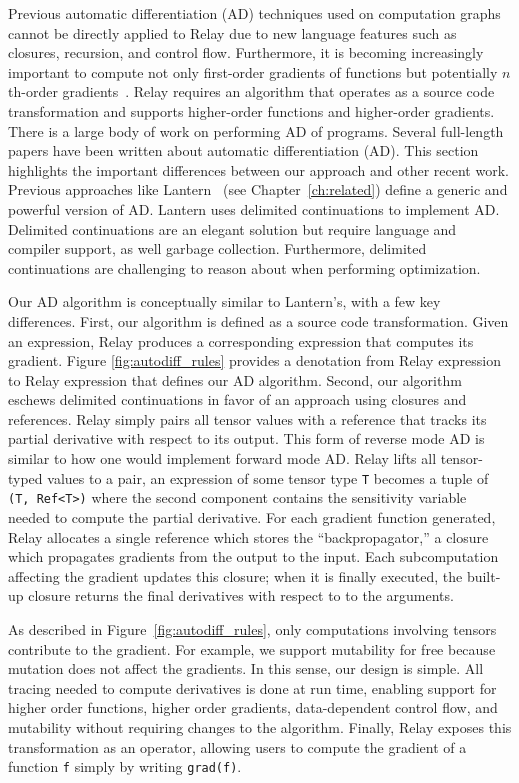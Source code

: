 Previous automatic differentiation (AD) techniques used on
  computation graphs cannot be directly applied to Relay due to new
  language features such as closures, recursion, and control flow.
Furthermore, it is becoming increasingly important to compute not
  only first-order gradients of functions
  but potentially $n$th-order gradients~\citep{neural_ode, darts}.
Relay requires an algorithm that operates as a source code transformation
  and supports higher-order functions and higher-order gradients.
There is a large body of work on performing AD
  of programs.
Several full-length papers have been written about automatic
  differentiation (AD).
This section highlights the important differences
  between our approach and other recent work.
Previous approaches like Lantern~\citep{lantern} (see Chapter~\ref{ch:related})
  define a generic and powerful version of AD.
Lantern uses delimited continuations to implement AD.
Delimited continuations are an elegant solution
  but require language and compiler support,
  as well garbage collection.
Furthermore, delimited continuations are challenging
  to reason about when performing optimization.

Our AD algorithm is conceptually similar to Lantern's,
  with a few key differences.
First, our algorithm is defined as a source code
  transformation.
Given an expression, Relay produces a corresponding
  expression that computes its gradient.
Figure \ref{fig:autodiff_rules} provides a denotation from
  Relay expression to Relay expression that defines our
  AD algorithm.
Second, our algorithm eschews delimited continuations in favor of
  an approach using closures and references.
Relay simply pairs all tensor values with a reference
  that tracks its partial derivative with respect to its
  output.
This form of reverse mode AD is similar to how one
  would implement forward mode AD.
Relay lifts all tensor-typed values to a pair,
  an expression of some tensor type \verb|T| becomes a tuple of \verb|(T, Ref<T>)|
  where the second component contains the sensitivity variable
  needed to compute the partial derivative.
For each gradient function generated, Relay allocates
  a single reference which stores the ``backpropagator,''
  a closure which propagates gradients from the output to the input.
Each subcomputation affecting the gradient updates this closure; when it is
  finally executed, the built-up closure returns the final derivatives with respect to
  to the arguments.

As described in Figure~\ref{fig:autodiff_rules}, only
  computations involving tensors contribute to the gradient.
For example, we support mutability for free because mutation
  does not affect the gradients.
In this sense, our design is simple.
All tracing needed to compute derivatives is done at run time, enabling
  support for higher order functions, higher order gradients,
  data-dependent control flow, and mutability without requiring changes
  to the algorithm.
Finally, Relay exposes this transformation as an operator, allowing users
  to compute the gradient of a function \verb|f| simply by writing \verb|grad(f)|.

